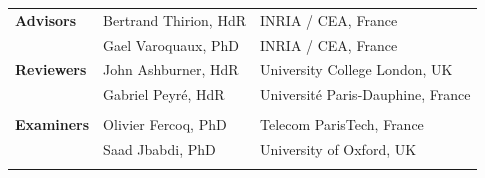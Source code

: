 \documentclass[nobib, a4paper, notoc, twoside, justified, openany]{tufte-book}
\begin{document}
\begin{titlepage}
\begin{fullwidth}
\begin{center}
{\LARGE
\begin{tabular}{lll}
\vspace{1pc}
\textbf{Advisors} & Bertrand Thirion, HdR & INRIA / CEA, France \\
\vspace{1pc}
 & Gael Varoquaux, PhD & INRIA / CEA, France \\
\vspace{1pc}
  \textbf{Reviewers} & John Ashburner, HdR  & University College London, UK  \\
  \vspace{1pc}  
& Gabriel Peyr\'e, HdR  & Universit\'e Paris-Dauphine, France  \\  \\
  \vspace{1pc}
  \textbf{Examiners} & Olivier Fercoq, PhD & Telecom ParisTech, France \\
  \vspace{1pc}
& Saad Jbabdi, PhD  & University of Oxford, UK \\
\vspace{1pc}
\end{tabular}
}


\end{center}
\end{fullwidth}
\end{titlepage}
\end{document}
